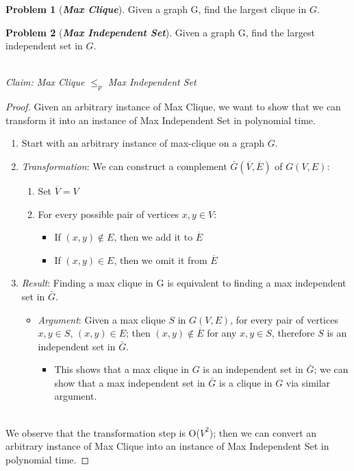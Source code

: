 \documentclass[12pt]{extarticle}
\theoremstyle{definition}
\newtheorem*{problem}{Problem}
\theoremstyle{remark}
\newcommand{\probname}[1]{\noindent \textbf{\textit{#1}}}
\begin{document}
\vspace{3pt}
\begin{problem}[\probname{Max Clique}]
    Given a graph G, find the largest clique in $G$.
\end{problem}
\begin{problem}[\probname{Max Independent Set}]
    Given a graph G, find the largest independent set in $G$.
\end{problem}

~\\
\noindent\textit{Claim: Max Clique $\leq_p$ Max Independent Set}
\begin{proof}
Given an arbitrary instance of Max Clique, we want to show that we can transform it into an instance of Max Independent Set in polynomial time.
\begin{enumerate}
    \item Start with an arbitrary instance of max-clique on a graph $G$.
    \item \textit{Transformation}: We can construct a complement $\bar{G}(\overline{V},\overline{E})$ of $G(V,E)$:\begin{enumerate}
        \item Set $\overline{V}=V$
        \item For every possible pair of vertices $x,y\in V$:\begin{itemize}
            \item If $(x,y)\not\in E$, then we add it to $\overline{E}$
            \item If $(x,y)\in E$, then we omit it from $\overline{E}$
        \end{itemize}
    \end{enumerate}
    \item \textit{Result}: Finding a max clique in G is equivalent to finding a max independent set in $\bar{G}$. \begin{itemize}
        \item \textit{Argument}: Given a max clique $S$ in $G(V,E)$, for every pair of vertices $x,y\in S$, $(x,y)\in E$; then $(x,y)\not\in\overline{E}$ for any $x,y\in S$, therefore $S$ is an independent set in $\bar{G}$.\begin{itemize}
            \item This shows that a max clique in $G$ is an independent set in $\bar{G}$; we can show that a max independent set in $\bar{G}$ is a clique in $G$ via similar argument.
        \end{itemize}
    \end{itemize}
\end{enumerate}
~\\
We observe that the transformation step is O($V^2$); then we can convert an arbitrary instance of Max Clique into an instance of Max Independent Set in polynomial time.
\end{proof}
\end{document}
